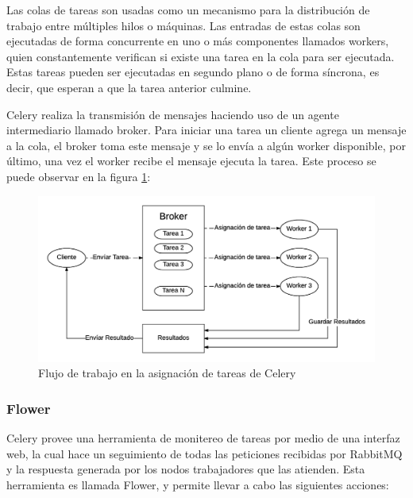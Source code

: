 Las colas de tareas son usadas como un mecanismo para la distribución de trabajo entre múltiples hilos o máquinas.
Las entradas de estas colas son ejecutadas de forma concurrente en uno o más componentes llamados workers, quien constantemente verifican si existe una tarea en la cola para ser ejecutada.
Estas tareas pueden ser ejecutadas en segundo plano o de forma síncrona, es decir, que esperan a que la tarea anterior culmine.

Celery realiza la transmisión de mensajes haciendo uso de un agente intermediario llamado broker.
Para iniciar una tarea un cliente agrega un mensaje a la cola, el broker toma este mensaje y se lo envía a algún worker disponible, por último, una vez el worker recibe el mensaje ejecuta la tarea.
Este proceso se puede observar en la figura \ref{fig:celery}:

\begin{figure}[H]
	\centering
		\includegraphics[width=.9\textwidth]{figures/celery}
	\caption{Flujo de trabajo en la asignación de tareas de Celery}
	\label{fig:celery}
\end{figure}

\subsubsection{Flower}

Celery provee una herramienta de monitereo de tareas por medio de una interfaz web,
la cual hace un seguimiento de todas las peticiones recibidas por RabbitMQ y la respuesta generada por los nodos trabajadores que las atienden.
Esta herramienta es llamada Flower, y permite llevar a cabo las siguientes acciones:


